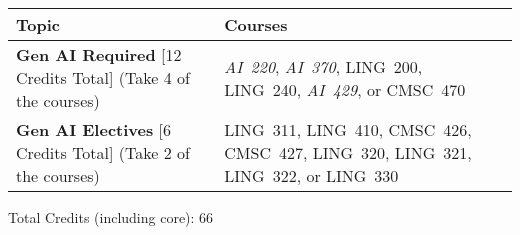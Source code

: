\begin{longtable}{p{7cm}>{\raggedleft\arraybackslash}p{7cm}}
Topic & Courses \\
\toprule
\textbf{Gen AI Required} [12 Credits Total] (Take 4 of the courses) & \textit{AI~220}, \textit{AI~370}, LING~200, LING~240, \textit{AI~429}, or CMSC~470 \\
\textbf{Gen AI Electives} [6 Credits Total] (Take 2 of the courses) & LING~311, LING~410, CMSC~426, CMSC~427, LING~320, LING~321, LING~322, or LING~330 \\
\bottomrule
\end{longtable}
Total Credits (including core): 66
